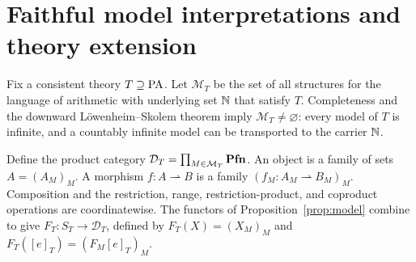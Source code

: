 \section{Faithful model interpretations and theory extension}\label{app:faithful-family}

Fix a consistent theory $T\supseteq\mathrm{PA}$.
Let $\mathcal M_T$ be the set of all structures for the language of
arithmetic with underlying set $\mathbb N$ that satisfy $T$.
Completeness and
the downward L\"owenheim--Skolem theorem imply
$\mathcal M_T\ne\varnothing$: every model of $T$ is infinite, and a
countably infinite model can be transported to the carrier $\mathbb N$.

Define the product category
$\mathcal D_T=\prod_{M\in\mathcal M_T}\mathbf{Pfn}$.
An object is a family of sets $A=(A_M)_M$. A morphism
$f:A\rightharpoonup B$ is a family
$(f_M:A_M\rightharpoonup B_M)_M$. Composition and the
restriction, range, restriction-product, and coproduct operations are coordinatewise.
The functors of Proposition~\ref{prop:model} combine to give
$F_T:S_T\to\mathcal D_T$, defined by $F_T(X)=(X_M)_M$ and
$F_T([e]_T)=(F_M[e]_T)_M$.

